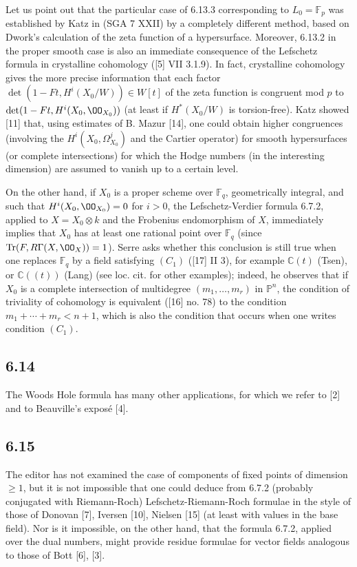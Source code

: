 Let us point out that the particular case of 6.13.3 corresponding to $L_0=\mathbb F_p$ was established by Katz in (SGA 7 XXII) by a completely different method, based on Dwork's calculation of the zeta function of a hypersurface. Moreover, 6.13.2 in the proper smooth case is also an immediate consequence of the Lefschetz formula in crystalline cohomology ([5] VII 3.1.9). In fact, crystalline cohomology gives the more precise information that each factor $\det(1-Ft,H^i(X_0/W))\in W[t]$ of the zeta function is congruent mod $p$ to $\det(1-Ft,H^i(X_0,\OO_{X_0}))$ (at least if $H^*(X_0/W)$ is torsion-free). Katz showed [11] that, using estimates of B. Mazur [14], one could obtain higher congruences (involving the $H^i(X_0,\Omega^j_{X_0})$ and the Cartier operator) for smooth hypersurfaces (or complete intersections) for which the Hodge numbers (in the interesting dimension) are assumed to vanish up to a certain level.

On the other hand, if $X_0$ is a proper scheme over $\mathbb F_q$, geometrically integral, and such that $H^i(X_0,\OO_{X_0})=0$ for $i>0$, the Lefschetz-Verdier formula 6.7.2, applied to $X=X_0\otimes k$ and the Frobenius endomorphism of $X$, immediately implies that $X_0$ has at least one rational point over $\mathbb F_q$ (since $\operatorname{Tr}(F,R\Gamma(X,\OO_X))=1$). Serre asks whether this conclusion is still true when one replaces $\mathbb F_q$ by a field satisfying $(C_1)$ ([17] II 3), for example $\mathbb C(t)$ (Tsen), or $\mathbb C((t))$ (Lang) (see loc. cit. for other examples); indeed, he observes that if $X_0$ is a complete intersection of multidegree $(m_1,\ldots,m_r)$ in $\mathbb P^n$, the condition of triviality of cohomology is equivalent ([16] no. 78) to the condition $m_1+\cdots+m_r<n+1$, which is also the condition that occurs when one writes condition $(C_1)$.

\subsection*{6.14}
The Woods Hole formula has many other applications, for which we refer to [2] and to Beauville's exposé [4].


\subsection*{6.15}

The editor has not examined the case of components of fixed points of dimension $\geq1$, but it is not impossible that one could deduce from 6.7.2 (probably conjugated with Riemann-Roch) Lefschetz-Riemann-Roch formulae in the style of those of Donovan [7], Iversen [10], Nielsen [15] (at least with values in the base field). Nor is it impossible, on the other hand, that the formula 6.7.2, applied over the dual numbers, might provide residue formulae for vector fields analogous to those of Bott [6], [3].


